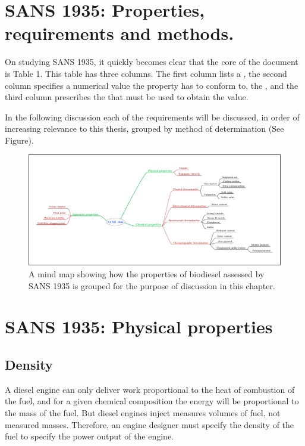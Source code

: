 \section{SANS 1935: Properties, requirements and methods.}

On studying SANS 1935, it quickly becomes clear that the core of the document
is Table 1. This table has three columns. The first column lists a
, the second column specifies a numerical value the property
has to conform to, the , and the third column prescribes
the  that must be used to obtain the value.

In the following discussion each of the requirements will be discussed, in order
of increasing relevance to this thesis, grouped by method of determination (See Figure).


\begin{figure}
\centering
\includegraphics[width=\textwidth]{Figures/SANS1935.pdf}
\decoRule

\caption[Discussion of SANS 1935.]{A mind map showing how the properties of
biodiesel assessed by SANS 1935 is grouped for the purpose of discussion in this
chapter.}

\label{fig:RancidRadical}
\end{figure}

\section{SANS 1935: Physical properties}

\subsection{Density}

A diesel engine can only deliver work proportional to the heat of combustion of
the fuel, and for a given chemical composition the energy will be proportional
to the mass of the fuel. But diesel engines inject measures volumes of fuel, not
measured masses. Therefore, an engine designer must specify the density of the
fuel to specify the power output of the engine.

